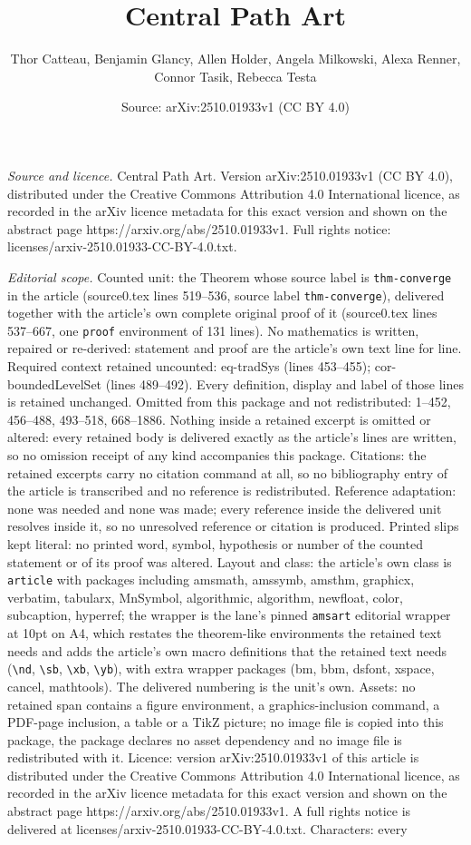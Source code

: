 \documentclass[10pt,a4paper]{amsart}
\title[Central Path Art]{Central Path Art}
\author{Thor Catteau, Benjamin Glancy, Allen Holder, Angela Milkowski, Alexa Renner, Connor Tasik, Rebecca Testa}
\date{Source: arXiv:2510.01933v1 (CC BY 4.0)}
\begin{document}
\maketitle

\noindent\emph{Source and licence.} Central Path Art. Version arXiv:2510.01933v1 (CC BY 4.0), distributed under the Creative Commons Attribution 4.0 International licence, as recorded in the arXiv licence metadata for this exact version and shown on the abstract page https://arxiv.org/abs/2510.01933v1. Full rights notice: licenses/arxiv-2510.01933-CC-BY-4.0.txt.\par\smallskip

\noindent\textit{Editorial scope.} Counted unit: the Theorem whose source label is \texttt{thm-converge} in the article (source0.tex lines 519--536, source label \texttt{thm-converge}), delivered together with the article's own complete original proof of it (source0.tex lines 537--667, one \texttt{proof} environment of 131 lines). No mathematics is written, repaired or re-derived: statement and proof are the article's own text line for line. Required context retained uncounted: eq-tradSys (lines 453--455); cor-boundedLevelSet (lines 489--492). Every definition, display and label of those lines is retained unchanged. Omitted from this package and not redistributed: 1--452, 456--488, 493--518, 668--1886. Nothing inside a retained excerpt is omitted or altered: every retained body is delivered exactly as the article's lines are written, so no omission receipt of any kind accompanies this package. Citations: the retained excerpts carry no citation command at all, so no bibliography entry of the article is transcribed and no reference is redistributed. Reference adaptation: none was needed and none was made; every reference inside the delivered unit resolves inside it, so no unresolved reference or citation is produced. Printed slips kept literal: no printed word, symbol, hypothesis or number of the counted statement or of its proof was altered. Layout and class: the article's own class is \texttt{article} with packages including amsmath, amssymb, amsthm, graphicx, verbatim, tabularx, MnSymbol, algorithmic, algorithm, newfloat, color, subcaption, hyperref; the wrapper is the lane's pinned \texttt{amsart} editorial wrapper at 10pt on A4, which restates the theorem-like environments the retained text needs and adds the article's own macro definitions that the retained text needs (\texttt{\textbackslash nd}, \texttt{\textbackslash sb}, \texttt{\textbackslash xb}, \texttt{\textbackslash yb}), with extra wrapper packages (bm, bbm, dsfont, xspace, cancel, mathtools). The delivered numbering is the unit's own. Assets: no retained span contains a figure environment, a graphics-inclusion command, a PDF-page inclusion, a table or a TikZ picture; no image file is copied into this package, the package declares no asset dependency and no image file is redistributed with it. Licence: version arXiv:2510.01933v1 of this article is distributed under the Creative Commons Attribution 4.0 International licence, as recorded in the arXiv licence metadata for this exact version and shown on the abstract page https://arxiv.org/abs/2510.01933v1. A full rights notice is delivered at licenses/arxiv-2510.01933-CC-BY-4.0.txt. Characters: every 
\end{document}
